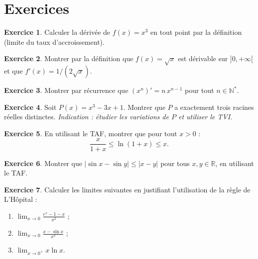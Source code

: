 \documentclass[12pt,a4paper,openany]{book}
\theoremstyle{definition}
\newtheorem{exercice}{Exercice}[chapter]
\newcommand{\N}{\mathbb{N}}
\newcommand{\R}{\mathbb{R}}
\begin{document}
\section{Exercices}\label{sec:exercices-ch6}

\begin{exercice}\label{exo:derivable-x3}
Calculer la dérivée de $f(x) = x^3$ en tout point par la définition (limite du taux d'accroissement).
\end{exercice}

\begin{exercice}\label{exo:derive-sqrt-def}
Montrer par la définition que $f(x) = \sqrt{x}$ est dérivable sur $]0, +\infty[$ et que $f'(x) = 1/(2\sqrt{x})$.
\end{exercice}

\begin{exercice}\label{exo:derivee-xn}
Montrer par récurrence que $(x^n)' = n\,x^{n-1}$ pour tout $n \in \N^*$.
\end{exercice}

\begin{exercice}\label{exo:rolle-application}
Soit $P(x) = x^3 - 3x + 1$. Montrer que $P$ a exactement trois racines réelles distinctes.
\textit{Indication : étudier les variations de $P$ et utiliser le TVI.}
\end{exercice}

\begin{exercice}\label{exo:TAF-inegalite}
En utilisant le TAF, montrer que pour tout $x > 0$ :
\[
  \frac{x}{1+x} \leqslant \ln(1 + x) \leqslant x.
\]
\end{exercice}

\begin{exercice}\label{exo:TAF-sin}
Montrer que $|\sin x - \sin y| \leqslant |x - y|$ pour tous $x, y \in \R$, en utilisant le TAF.
\end{exercice}

\begin{exercice}\label{exo:hopital-exemples}
Calculer les limites suivantes en justifiant l'utilisation de la règle de L'Hôpital :
\begin{enumerate}[label=\textup{(\alph*)}]
  \item $\displaystyle\lim_{x \to 0} \frac{e^x - 1 - x}{x^2}$ ;
  \item $\displaystyle\lim_{x \to 0} \frac{x - \sin x}{x^3}$ ;
  \item $\displaystyle\lim_{x \to 0^+} x\ln x$.
\end{enumerate}
\end{exercice}
\end{document}
